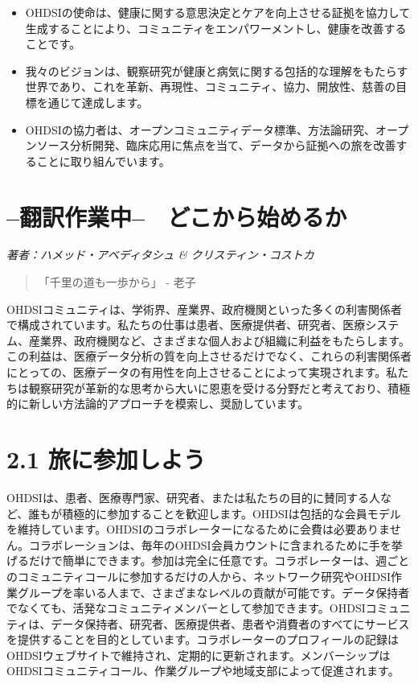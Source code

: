 \documentclass[
  11pt]{book}
\makeatletter
\newenvironment{kframe}{%
\medskip{}
\setlength{\fboxsep}{.8em}
 \def\at@end@of@kframe{}%
 \ifinner\ifhmode%
  \def\at@end@of@kframe{\end{minipage}}%
  \begin{minipage}{\columnwidth}%
 \fi\fi%
 \def\FrameCommand##1{\hskip\@totalleftmargin \hskip-\fboxsep
 \colorbox{myShadeColor}{##1}\hskip-\fboxsep
     \hskip-\linewidth \hskip-\@totalleftmargin \hskip\columnwidth}%
 \MakeFramed {\advance\hsize-\width
   \@totalleftmargin\z@ \linewidth\hsize
   \@setminipage}}%
 {\par\unskip\endMakeFramed%
 \at@end@of@kframe}
\newenvironment{rmdblock}[1]
  {
  \begin{itemize}
  \renewcommand{\labelitemi}{
    \raisebox{-.7\height}[0pt][0pt]{
      {\setkeys{Gin}{width=3em,keepaspectratio}\texttt{[image: images/\#1]}}
    }
  }
  \setlength{\fboxsep}{1em}
  \begin{kframe}
  \item
  }
  {
  \end{kframe}
  \end{itemize}
  }
\newenvironment{rmdsummary}
  {\begin{rmdblock}{summary}}
  {\end{rmdblock}}
\theoremstyle{definition}
\theoremstyle{definition}
\theoremstyle{definition}
\theoremstyle{definition}
\theoremstyle{remark}
\makeatother
\begin{document}
\begin{rmdsummary}
\begin{itemize}
\item
  OHDSIの使命は、健康に関する意思決定とケアを向上させる証拠を協力して生成することにより、コミュニティをエンパワーメントし、健康を改善することです。
\item
  我々のビジョンは、観察研究が健康と病気に関する包括的な理解をもたらす世界であり、これを革新、再現性、コミュニティ、協力、開放性、慈善の目標を通じて達成します。
\item
  OHDSIの協力者は、オープンコミュニティデータ標準、方法論研究、オープンソース分析開発、臨床応用に焦点を当て、データから証拠への旅を改善することに取り組んでいます。
\end{itemize}
\end{rmdsummary}

\chapter{--翻訳作業中--　どこから始めるか}\label{WhereToBegin}

\emph{著者：ハメッド・アベディタシュ \& クリスティン・コストカ}

\begin{quote}
「千里の道も一歩から」 - 老子
\end{quote}

OHDSIコミュニティは、学術界、産業界、政府機関といった多くの利害関係者で構成されています。私たちの仕事は患者、医療提供者、研究者、医療システム、産業界、政府機関など、さまざまな個人および組織に利益をもたらします。この利益は、医療データ分析の質を向上させるだけでなく、これらの利害関係者にとっての、医療データの有用性を向上させることによって実現されます。私たちは観察研究が革新的な思考から大いに恩恵を受ける分野だと考えており、積極的に新しい方法論的アプローチを模索し、奨励しています。

\chapter{2.1 旅に参加しよう}\label{ux65c5ux306bux53c2ux52a0ux3057ux3088ux3046}

OHDSIは、患者、医療専門家、研究者、または私たちの目的に賛同する人など、誰もが積極的に参加することを歓迎します。OHDSIは包括的な会員モデルを維持しています。OHDSIのコラボレーターになるために会費は必要ありません。コラボレーションは、毎年のOHDSI会員カウントに含まれるために手を挙げるだけで簡単にできます。参加は完全に任意です。コラボレーターは、週ごとのコミュニティコールに参加するだけの人から、ネットワーク研究やOHDSI作業グループを率いる人まで、さまざまなレベルの貢献が可能です。データ保持者でなくても、活発なコミュニティメンバーとして参加できます。OHDSIコミュニティは、データ保持者、研究者、医療提供者、患者や消費者のすべてにサービスを提供することを目的としています。コラボレーターのプロフィールの記録はOHDSIウェブサイトで維持され、定期的に更新されます。メンバーシップはOHDSIコミュニティコール、作業グループや地域支部によって促進されます。
\end{document}
